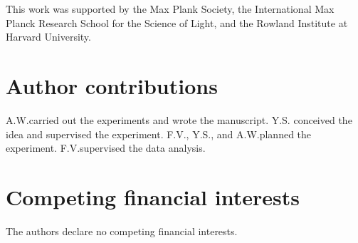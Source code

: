 \documentclass[floatfix,superscriptaddress,a4paper,twocolumn]{revtex4-1}
\begin{document}
This work was supported by the Max Plank Society, the International Max
Planck Research School for the Science of Light, and the Rowland Institute
at Harvard University.

\section*{Author contributions}
A.W.\@ carried out the experiments and wrote the manuscript.  Y.S.\@
conceived the idea and supervised the experiment.  F.V., Y.S., and
A.W.\@ planned the experiment.  F.V.\@ supervised the data analysis.

\section*{Competing financial interests}
The authors declare no competing financial interests.

\nocite{hussain2005ots}
\nocite{gottschling2000detection}
\nocite{snellings2001response}
\nocite{srsqcm200manual}
\nocite{su2005comparison}
\nocite{peh2007understanding}


%
\end{document}
